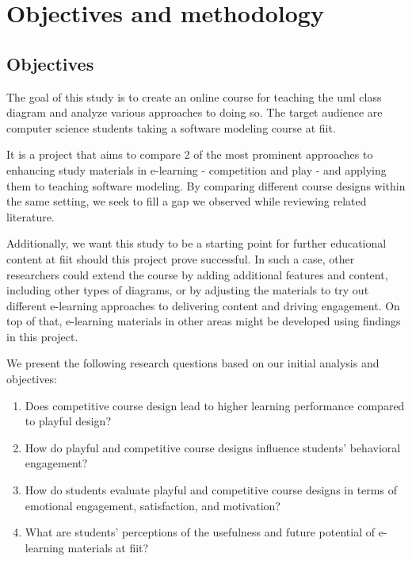 \chapter{Objectives and methodology}

\section{Objectives}

The goal of this study is to create an online course for teaching the \ac{uml} class diagram and analyze various approaches to doing so. The target audience are computer science students taking a software modeling course at \ac{fiit}. %

It is a project that aims to compare 2 of the most prominent approaches to enhancing study materials in e-learning - competition and play - and applying them to teaching software modeling. By comparing different course designs within the same setting, we seek to fill a gap we observed while reviewing related literature.


Additionally, we want this study to be a starting point for further educational content at \ac{fiit} should this project prove successful. In such a case, other researchers could extend the course by adding additional features and content, including other types of diagrams, or by adjusting the materials to try out different e-learning approaches to delivering content and driving engagement. On top of that, e-learning materials in other areas might be developed using findings in this project.

We present the following research questions based on our initial analysis and objectives:

\begin{enumerate}
    \item Does competitive course design lead to higher learning performance compared to playful design?
    
    \item How do playful and competitive course designs influence students’ behavioral engagement?
    
    \item How do students evaluate playful and competitive course designs in terms of emotional engagement, satisfaction, and motivation?
    
    \item What are students’ perceptions of the usefulness and future potential of e-learning materials at \ac{fiit}?
\end{enumerate}

